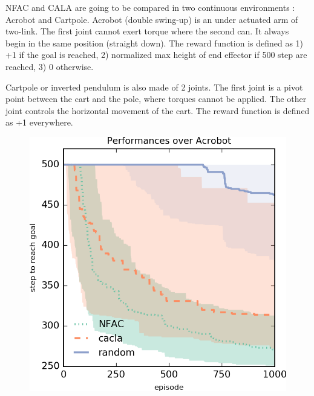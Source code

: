 
NFAC and CALA are going to be compared in two continuous environments : Acrobot and Cartpole.
Acrobot (double swing-up) is an under actuated arm of two-link. The first joint
cannot exert torque where the second can.
It always begin in the same position (straight down).
The reward function is defined as 1) +1 if the goal is reached, 2) normalized max 
height of end effector if 500 step are reached, 3) 0 otherwise.

Cartpole or inverted pendulum is also made of 2 joints. The first joint is a pivot point 
between the cart and the pole, where torques cannot be applied. The other joint controls
the horizontal movement of the cart.
The reward function is defined as +1 everywhere.

\begin{figure}[h]
\centering
\begin{minipage}{.5\textwidth}
  \centering
  \includegraphics[width=0.95\linewidth]{result_plotting/adacrobot-1ddl_perf.png}
\end{minipage}%
\begin{minipage}{.5\textwidth}
  \centering

\end{minipage}
\end{figure}
